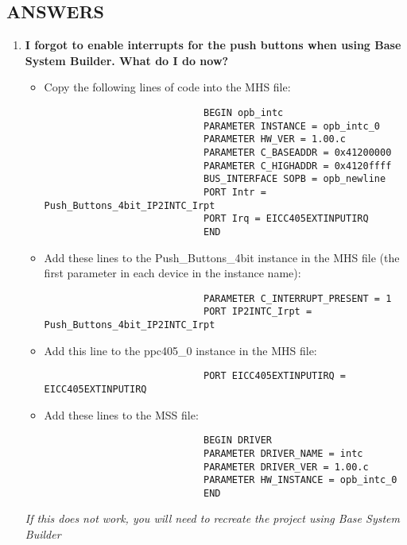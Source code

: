 	\subsection{ANSWERS}
		\begin{enumerate}
			\item \textbf{I forgot to enable interrupts for the push buttons when using Base System Builder. What do I do now?}
				\begin{itemize}
					\item Copy the following lines of code into the MHS file:
						\begin{verbatim}
							BEGIN opb_intc
							PARAMETER INSTANCE = opb_intc_0
							PARAMETER HW_VER = 1.00.c
							PARAMETER C_BASEADDR = 0x41200000
							PARAMETER C_HIGHADDR = 0x4120ffff
							BUS_INTERFACE SOPB = opb_newline
							PORT Intr = Push_Buttons_4bit_IP2INTC_Irpt
							PORT Irq = EICC405EXTINPUTIRQ
							END
						\end{verbatim}
					\item Add these lines to the Push\_Buttons\_4bit instance in the MHS file (the first parameter in each device in the instance name):
						\begin{verbatim}
							PARAMETER C_INTERRUPT_PRESENT = 1
							PORT IP2INTC_Irpt = Push_Buttons_4bit_IP2INTC_Irpt
						\end{verbatim}
					\item Add this line to the ppc405\_0 instance in the MHS file:
						\begin{verbatim}
							PORT EICC405EXTINPUTIRQ = EICC405EXTINPUTIRQ
						\end{verbatim}
					\item Add these lines to the MSS file:
						\begin{verbatim}
							BEGIN DRIVER
							PARAMETER DRIVER_NAME = intc
							PARAMETER DRIVER_VER = 1.00.c
							PARAMETER HW_INSTANCE = opb_intc_0
							END
						\end{verbatim}
				\end{itemize}
				\textit{If this does not work, you will need to recreate the project using Base System Builder}		
					

\end{enumerate}
